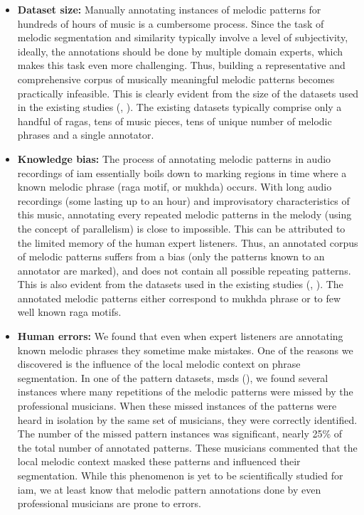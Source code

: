 \begin{itemize}
	\item \textbf{Dataset size:} Manually annotating instances of melodic patterns for hundreds of hours of music is a cumbersome process. Since the task of melodic segmentation and similarity typically involve a level of subjectivity, ideally, the annotations should be done by multiple domain experts, which makes this task even more challenging. Thus, building a representative and comprehensive corpus of musically meaningful melodic patterns becomes practically infeasible. This is clearly evident from the size of the datasets used in the existing studies (, ).  The existing datasets typically comprise only a handful of \glspl{raga}, tens of music pieces, tens of unique number of melodic phrases and a single annotator.

	\item \textbf{Knowledge bias:} The process of annotating melodic patterns in audio recordings of \gls{iam} essentially boils down to marking regions in time where a known melodic phrase (\gls{raga} motif, or \gls{mukhda}) occurs. With long audio recordings (some lasting up to an hour) and improvisatory characteristics of this music, annotating every repeated melodic patterns in the melody (using the concept of parallelism) is close to impossible. This can be attributed to the limited memory of the human expert listeners. Thus, an annotated corpus of melodic patterns suffers from a bias (only the patterns known to an annotator are marked), and does not contain all possible repeating patterns. This is also evident from the datasets used in the existing studies (, ). The annotated melodic patterns either correspond to \gls{mukhda} phrase or to few well known \gls{raga} motifs. 
	
	\item \textbf{Human errors:} We found that even when expert listeners are annotating known melodic phrases they sometime make mistakes. One of the reasons we discovered is the influence of the local melodic context on phrase segmentation. In one of the pattern datasets, \acrshort{msds} (), we found several instances where many repetitions of the melodic patterns were missed by the professional musicians. When these missed instances of the patterns were heard in isolation by the same set of musicians, they were correctly identified. The number of the missed pattern instances was significant, nearly 25\% of the total number of annotated patterns. These musicians commented that the local melodic context masked these patterns and influenced their segmentation. While this phenomenon is yet to be scientifically studied for \gls{iam}, we at least know that melodic pattern annotations done  by even professional musicians are prone to errors. 			
\end{itemize}

